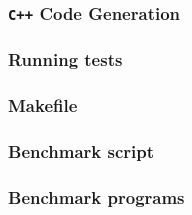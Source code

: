 \subsubsection{\texttt{C++} Code Generation}


\subsubsection{Running tests}


\subsubsection{Makefile}


\subsubsection{Benchmark script}


\subsubsection{Benchmark programs} \label{sec:benchmark-programs}




